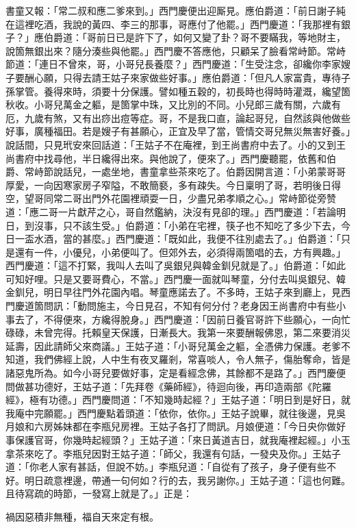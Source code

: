 書童又報：「常二叔和應二爹來到。」西門慶便出迎厮見。應伯爵道：「前日謝子純在這裡吃酒，我說的黃四、李三的那事，哥應付了他罷。」西門慶道：「我那裡有銀子？」應伯爵道：「哥前日已是許下了，如何又變了卦？哥不要瞞我，等地財主，說箇無銀出來？隨分湊些與他罷。」西門慶不答應他，只顧呆了臉看常峙節。{}常峙節道：「連日不曾來，哥，小哥兒長養麼？」西門慶道：「生受注念，卻纔你李家嫂子要酬心願，只得去請王姑子來家做些好事。」應伯爵道：「但凡人家富貴，專待子孫掌管。養得來時，須要十分保護。譬如種五穀的，初長時也得時時灌溉，纔望箇秋收。小哥兒萬金之軀，是箇掌中珠，又比別的不同。小兒郎三歲有關，六歲有厄，九歲有煞，又有出痧出痘等症。哥，不是我口直，論起哥兒，自然該與他做些好事，廣種福田。若是嫂子有甚願心，正宜及早了當，管情交哥兒無災無害好養。」說話間，只見玳安來回話道：「王姑子不在庵裡，到王尚書府中去了。小的又到王尚書府中找尋他，半日纔得出來。與他說了，便來了。」西門慶聽罷，依舊和伯爵、常峙節說話兒，一處坐地，書童拿些茶來吃了。伯爵因開言道：「小弟蒙哥哥厚愛，一向因寒家房子窄隘，不敢簡褻，多有疎失。今日稟明了哥，若明後日得空，望哥同常二哥出門外花園裡頑耍一日，少盡兄弟孝順之心。」常峙節從旁赞道：「應二哥一片獻芹之心，哥自然鑑納，決沒有見卻的理。」西門慶道：「若論明日，到沒事，只不該生受。」伯爵道：「小弟在宅裡，筷子也不知吃了多少下去，{}今日一盃水酒，當的甚麼。」西門慶道：「既如此，我便不往別處去了。」伯爵道：「只是還有一件，小優兒，小弟便叫了。但郊外去，必須得兩箇唱的去，方有興趣。」西門慶道：「這不打緊，我叫人去叫了吳銀兒與韓金釧兒就是了。」伯爵道：「如此可知好哩。只是又要哥費心，不當。」西門慶一面就叫琴童，分付去叫吳銀兒、韓金釧兒，明日早往門外花園內唱。琴童應諾去了。不多時，王姑子來到廳上，見西門慶道箇問訊：「動問施主，今日見召，不知有何分付？老身因王尚書府中有些小事去了，不得便來，方纔得脫身。」西門慶道：「因前日養官哥許下些願心，一向忙碌碌，未曾完得。托賴皇天保護，日漸長大。我第一來要酬報佛恩，第二來要消災延壽，因此請師父來商議。」王姑子道：「小哥兒萬金之軀，全憑佛力保護。老爹不知道，我們佛經上說，人中生有夜叉羅剎，常喜啖人，令人無子，傷胎奪命，皆是諸惡鬼所為。{}如今小哥兒要做好事，定是看經念佛，其餘都不是路了。」西門慶便問做甚功德好，王姑子道：「先拜卷《藥師經》，待迴向後，再印造兩部《陀羅經》，極有功德。」西門慶問道：「不知幾時起經？」王姑子道：「明日到是好日，就我庵中完願罷。」西門慶點着頭道：「依你，依你。」王姑子說畢，就往後邊，見吳月娘和六房姊妹都在李瓶兒房裡。王姑子各打了問訊。月娘便道：「今日央你做好事保護官哥，你幾時起經頭？」王姑子道：「來日黃道吉日，就我庵裡起經。」小玉拿茶來吃了。李瓶兒因對王姑子道：「師父，我還有句話，一發央及你。」王姑子道：「你老人家有甚話，但說不妨。」李瓶兒道：「自從有了孩子，身子便有些不好。明日疏意裡邊，帶通一句何如？行的去，我另謝你。」王姑子道：「這也何難。且待寫疏的時節，一發寫上就是了。」正是：

\begin{myquote}
禍因惡積非無種，福自天來定有根。
\end{myquote}

